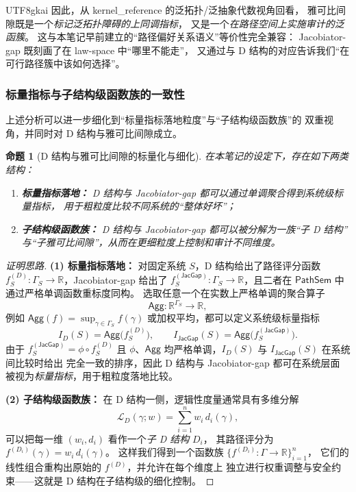 \documentclass[12pt]{article}
\newtheorem{proposition}{命题}[section]
\newcommand{\JacGap}{\mathsf{JacGap}}
\begin{document}
\begin{CJK*}{UTF8}{gkai}
因此，从 kernel\_reference 的泛拓扑/泛抽象代数视角回看，
雅可比间隙既是一个\emph{标记泛拓扑障碍的上同调指标}，
又是一个\emph{在路径空间上实施审计的泛函簇}。
这与本笔记早前建立的“路径偏好关系语义”等价性完全兼容：
Jacobiator-gap 既刻画了在 law-space 中“哪里不能走”，
又通过与 D 结构的对应告诉我们“在可行路径簇中该如何选择”。

\subsubsection*{标量指标与子结构级函数族的一致性}

上述分析可以进一步细化到“标量指标落地粒度”与“子结构级函数族”的
双重视角，并同时对 D 结构与雅可比间隙成立。

\begin{proposition}[D 结构与雅可比间隙的标量化与细化]
在本笔记的设定下，存在如下两类结构：
  \begin{enumerate}
    \item \textbf{标量指标落地：}
      D 结构与 Jacobiator-gap 都可以通过单调聚合得到系统级标量指标，
      用于粗粒度比较不同系统的“整体好坏”；
    \item \textbf{子结构级函数族：}
      D 结构与 Jacobiator-gap 都可以被分解为一族“子 D 结构”
      与“子雅可比间隙”，从而在更细粒度上控制和审计不同维度。
  \end{enumerate}
\end{proposition}

\begin{proof}[证明思路]
\textbf{(1) 标量指标落地：}
对固定系统 $S$，D 结构给出了路径评分函数
$f^{(D)}_S:\Gamma_S\to\mathbb{R}$，Jacobiator-gap 给出了
$f^{(\JacGap)}_S:\Gamma_S\to\mathbb{R}$，且二者在
$\mathsf{PathSem}$ 中通过严格单调函数重标度同构。
选取任意一个在实数上严格单调的聚合算子
\[
  \mathsf{Agg}:\mathbb{R}^{\Gamma_S}\longrightarrow\mathbb{R},
\]
例如
$\mathsf{Agg}(f)=\sup_{\gamma\in\Gamma_S} f(\gamma)$
或加权平均，都可以定义系统级标量指标
\[
  I_D(S)=\mathsf{Agg}\bigl(f^{(D)}_S\bigr),
  \qquad
  I_{\JacGap}(S)=\mathsf{Agg}\bigl(f^{(\JacGap)}_S\bigr).
\]
由于 $f^{(\JacGap)}_S=\phi\circ f^{(D)}_S$ 且 $\phi$、$\mathsf{Agg}$
均严格单调，$I_D(S)$ 与 $I_{\JacGap}(S)$ 在系统间比较时给出
完全一致的排序，因此 D 结构与 Jacobiator-gap 都可在系统层面
被视为\emph{标量指标}，用于粗粒度落地比较。

\textbf{(2) 子结构级函数族：}
在 D 结构一侧，逻辑性度量通常具有多维分解
\[
  \mathcal{L}_D(\gamma;w)
  =
  \sum_{i=1}^n w_i\,d_i(\gamma),
\]
可以把每一维 $(w_i,d_i)$ 看作一个\emph{子 D 结构} $D_i$，
其路径评分为
$f^{(D_i)}(\gamma)=w_i\,d_i(\gamma)$。
这样我们得到一个函数族
$\{f^{(D_i)}:\Gamma\to\mathbb{R}\}_{i=1}^n$，
它们的线性组合重构出原始的 $f^{(D)}$，并允许在每个维度上
独立进行权重调整与安全约束——这就是 D 结构在子结构级的细化控制。


\end{proof}
\end{CJK*}
\end{document}
